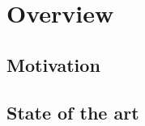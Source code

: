 \chapter{Overview}
\label{chap:Overview}
\section{Motivation}
\label{sec:Motivation}
\section{State of the art}
 \label{sec:StateArt}